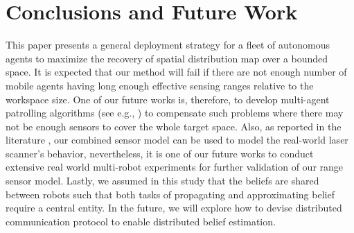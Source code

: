 \documentclass[letterpaper, 10 pt, conference]{ieeeconf}
\begin{document}
\section{Conclusions and Future Work}
\label{sec:sec9}
This paper presents a general deployment strategy for a fleet of autonomous agents to maximize the recovery of spatial distribution map over a bounded space. 
It is expected that our method will fail if there are not enough number of mobile agents having long enough effective sensing ranges relative to the workspace size. 
One of our future works is, therefore, to develop multi-agent patrolling algorithms (see e.g., \cite{portugal2011survey}) to compensate such problems where there may not be enough sensors to cover the whole target space.
Also, as reported in the literature \cite{anguelov2004detecting}, our combined sensor model can be used to model the real-world laser scanner's behavior, nevertheless, it is one of our future works to conduct extensive real world multi-robot experiments for further validation of our range sensor model.
Lastly, we assumed in this study that the beliefs are shared between robots such that both tasks of propagating and approximating belief require a central entity. 
In the future, we will explore how to devise distributed communication protocol to enable distributed belief estimation. 




\end{document}
